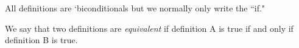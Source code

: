 \documentclass{ximera}
\begin{document}
All definitions are `biconditionals but we normally only write the ``if."

We say that two definitions are \emph{equivalent} if definition A is true if and only if definition B is true. 
%
\end{document}
